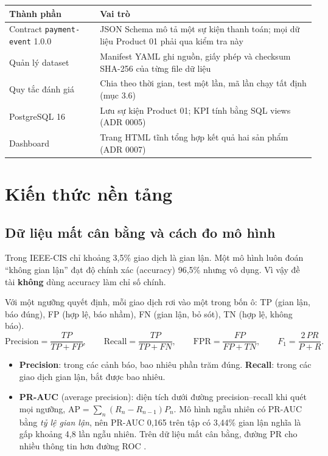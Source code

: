 \documentclass[11pt,a4paper]{article}
\newcommand{\code}[1]{\texttt{\small #1}}
\begin{document}
\begin{tabularx}{\linewidth}{@{}lX@{}}
\toprule
\textbf{Thành phần} & \textbf{Vai trò} \\ \midrule
Contract \code{payment-event} 1.0.0 & JSON Schema mô tả một sự kiện thanh toán; mọi dữ liệu Product 01 phải qua kiểm tra này \\
Quản lý dataset & Manifest YAML ghi nguồn, giấy phép và checksum SHA-256 của từng file dữ liệu \\
Quy tắc đánh giá & Chia theo thời gian, test một lần, mã lần chạy tất định (mục 3.6) \\
PostgreSQL 16 & Lưu sự kiện Product 01; KPI tính bằng SQL views (ADR 0005) \\
Dashboard & Trang HTML tĩnh tổng hợp kết quả hai sản phẩm (ADR 0007) \\ \bottomrule
\end{tabularx}

\section{Kiến thức nền tảng}

\subsection{Dữ liệu mất cân bằng và cách đo mô hình}

Trong IEEE-CIS chỉ khoảng 3,5\% giao dịch là gian lận. Một mô hình luôn đoán ``không gian lận'' đạt độ chính xác (accuracy) 96,5\% nhưng vô dụng. Vì vậy đề tài \textbf{không} dùng accuracy làm chỉ số chính.

Với một ngưỡng quyết định, mỗi giao dịch rơi vào một trong bốn ô: TP (gian lận, báo đúng), FP (hợp lệ, báo nhầm), FN (gian lận, bỏ sót), TN (hợp lệ, không báo).
\[
\text{Precision}=\frac{TP}{TP+FP},\qquad
\text{Recall}=\frac{TP}{TP+FN},\qquad
\text{FPR}=\frac{FP}{FP+TN},\qquad
F_1=\frac{2\,PR}{P+R}.
\]
\begin{itemize}
  \item \textbf{Precision}: trong các cảnh báo, bao nhiêu phần trăm đúng. \textbf{Recall}: trong các giao dịch gian lận, bắt được bao nhiêu.
  \item \textbf{PR-AUC} (average precision): diện tích dưới đường precision--recall khi quét mọi ngưỡng, $\text{AP}=\sum_n (R_n-R_{n-1})P_n$. Mô hình ngẫu nhiên có PR-AUC bằng \emph{tỷ lệ gian lận}, nên PR-AUC 0,165 trên tập có 3,44\% gian lận nghĩa là gấp khoảng 4,8 lần ngẫu nhiên. Trên dữ liệu mất cân bằng, đường PR cho nhiều thông tin hơn đường ROC \cite{saito}.
\end{itemize}
\end{document}
